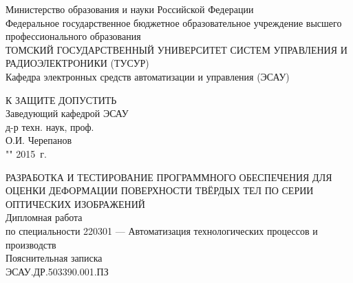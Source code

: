 \newpage
{}

\begin{center}
Министерство образования и науки Российской Федерации\\
Федеральное государственное бюджетное образовательное учреждение высшего профессионального образования\\
ТОМСКИЙ ГОСУДАРСТВЕННЫЙ УНИВЕРСИТЕТ СИСТЕМ УПРАВЛЕНИЯ И РАДИОЭЛЕКТРОНИКИ (ТУСУР)\\
Кафедра электронных средств автоматизации и управления (ЭСАУ)\\
\end{center}

\hfill
\begin{minipage}[right]{0.4\linewidth}
\begin{singlespace}
 К ЗАЩИТЕ ДОПУСТИТЬ \\
 Заведующий кафедрой ЭСАУ \\
 д-р техн. наук, проф.  \\
 \underline{\hspace{2.5cm}}О.И. Черепанов \\
 "\underline{\hspace{1cm}}"\underline{\hspace{3cm}} 2015~г.\\
\end{singlespace}
\end{minipage}


\begin{center}
РАЗРАБОТКА И ТЕСТИРОВАНИЕ ПРОГРАММНОГО ОБЕСПЕЧЕНИЯ ДЛЯ ОЦЕНКИ ДЕФОРМАЦИИ ПОВЕРХНОСТИ ТВЁРДЫХ ТЕЛ ПО СЕРИИ ОПТИЧЕСКИХ ИЗОБРАЖЕНИЙ \\
Дипломная работа \\
по специальности 220301 --- Автоматизация технологических процессов и производств\\
Пояснительная записка \\
ЭСАУ.ДР.503390.001.ПЗ
\vspace{0.1cm}
\end{center}

